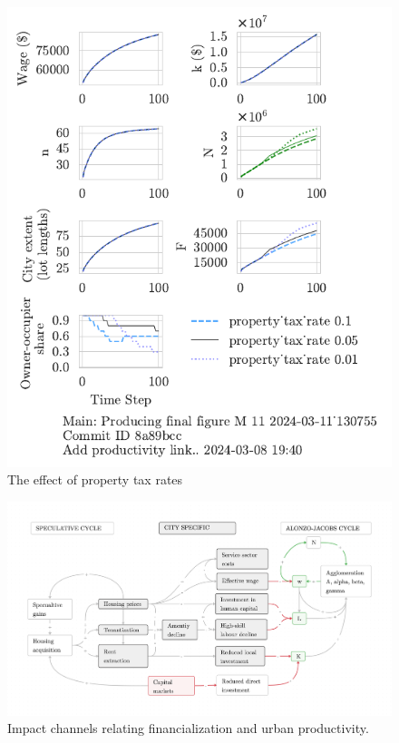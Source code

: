 \begin{figure}[h!tb]
    \centering
    \includegraphics[scale=.8, trim={0 1.4cm 0 0},clip]{fig/property_tax_rate-Main-130755.pdf}
    \caption{The effect of property tax rates}
    \label{fig:property_tax_ownership_trajectory}
\end{figure}


\begin{figure}[h!tb]\label{fig-impact-channels}
\begin{adjustwidth}{-0.24\textwidth}{-0.24\textwidth}
\centering
\includegraphics[scale=.15 ]{fig/impact-channels.png}%
\end{adjustwidth}
\caption{Impact channels relating financialization and urban productivity.}
\end{figure}



